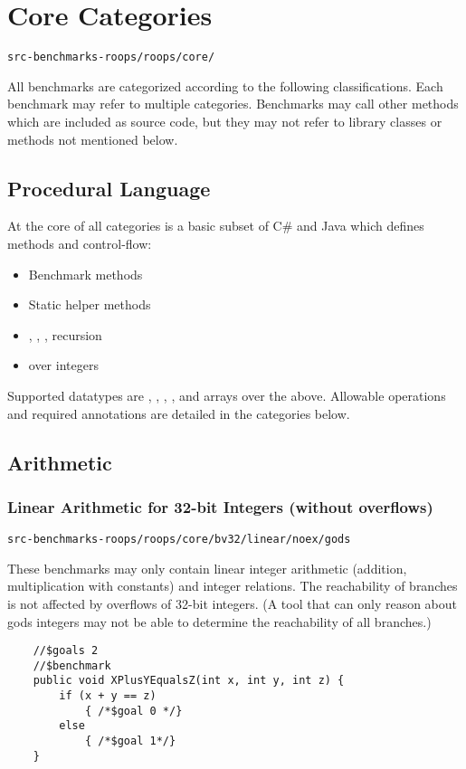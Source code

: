 \section{Core Categories}

\verb|src-benchmarks-roops/roops/core/|

All benchmarks are categorized according to the following classifications.
Each benchmark may refer to multiple categories.
Benchmarks may call other methods which are included as source code,
but they may not refer to library classes or methods not mentioned below.

\subsection{Procedural Language}

At the core of all categories is a basic subset of C\# and Java
which defines methods and control-flow:
\begin{itemize}
\item Benchmark methods
\item Static helper methods
\item {}, , , recursion
\item {} over integers
\end{itemize}

Supported datatypes are , , ,
, and arrays over the above.
Allowable operations and required annotations are detailed in the categories below.

\subsection{Arithmetic}

\subsubsection{Linear Arithmetic for 32-bit Integers (without overflows)}

\verb|src-benchmarks-roops/roops/core/bv32/linear/noex/gods|

These benchmarks may only contain linear integer arithmetic (addition, multiplication with constants)
and integer relations. The reachability of branches is not affected by overflows of 32-bit integers. 
(A tool that can only reason about gods integers may not be able to determine the 
reachability of all branches.)
\begin{verbatim}
    //$goals 2
    //$benchmark
    public void XPlusYEqualsZ(int x, int y, int z) {
        if (x + y == z)
            { /*$goal 0 */}
        else
            { /*$goal 1*/}
    }
\end{verbatim}


